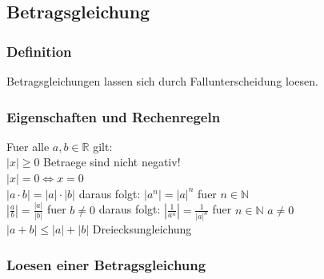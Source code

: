 \begin{multicols}{2}
    \subsection{Betragsgleichung}
    \vspace{-4mm}
    \subsubsection{Definition}
    \vspace{-4mm}
    Betragsgleichungen lassen sich durch Fallunterscheidung loesen.

    \subsubsection{Eigenschaften und Rechenregeln}
    \vspace{-4mm}
    Fuer alle $a, b \in \mathbb{R}$ gilt: \\
    $|x| \geq 0$ Betraege sind nicht negativ! \\
    $|x| = 0 \Leftrightarrow x = 0$ \\
    $|a \cdot b| = |a| \cdot |b|$ daraus folgt: $|a^n| = |a|^n$ fuer $n \in \mathbb{N}$ \\
    $|\frac{a}{b}| = \frac{|a|}{|b|}$ fuer $b \neq 0$  daraus folgt: $|\frac{1}{a^n}| = \frac{1}{|a|^n}$ fuer $n \in \mathbb{N}$ $a \neq 0$ \\
    $ |a+b| \leq |a| + |b|$ Dreiecksungleichung

    \subsubsection{Loesen einer Betragsgleichung}
    \vspace{-4mm}


\end{multicols}
